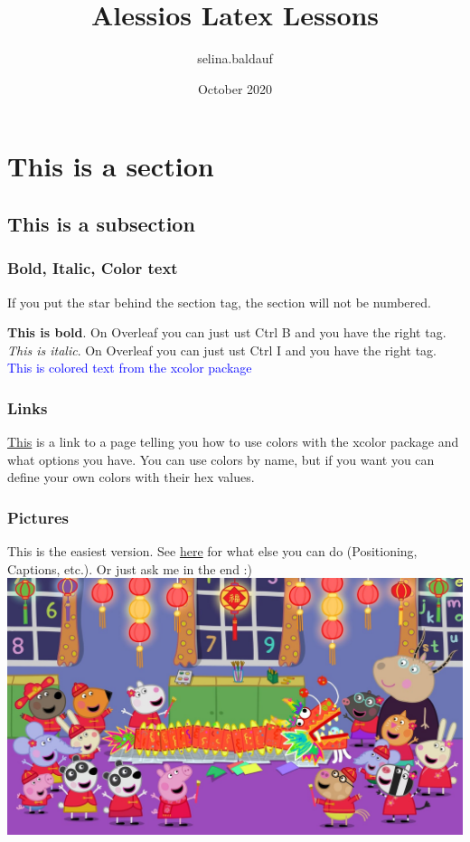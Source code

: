\documentclass{article}
\title{Alessios Latex Lessons}
\author{selina.baldauf }
\date{October 2020}
\begin{document}
\maketitle

\section{This is a section}
\subsection{This is a subsection}

\subsubsection*{Bold, Italic, Color text}

If you put the star behind the section tag, the section will not be numbered.

\textbf{This is bold}. On Overleaf you can just ust Ctrl B and you have the right tag.
\textit{This is italic}. On Overleaf you can just ust Ctrl I and you have the right tag.
\textcolor{blue}{This is colored text from the xcolor package}

\subsubsection*{Links}
 
\href{https://ftp.agdsn.de/pub/mirrors/latex/dante/macros/latex/contrib/xcolor/xcolor.pdf}{This} is a link to a page telling you how to use colors with the xcolor package and what options you have. You can use colors by name, but if you want you can define your own colors with their hex values.
 
\subsubsection*{Pictures}

This is the easiest version. See \href{https://www.overleaf.com/learn/latex/Inserting_Images}{here} for what else you can do (Positioning, Captions, etc.). Or just ask me in the end :) \\

\includegraphics[width=\textwidth]{images/peppaPig.jpg}
\end{document}

